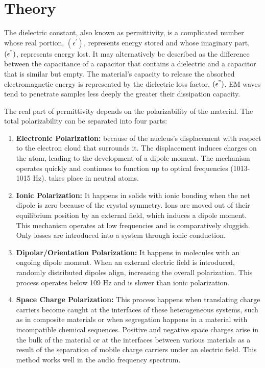 \section{Theory}

	The dielectric constant, also known as permittivity, is a complicated number whose real portion, $(\epsilon^{'})$, represents energy stored and whose imaginary part, $(\epsilon^")$, represents energy lost. It may alternatively be described as the difference between the capacitance of a capacitor that contains a dielectric and a capacitor that is similar but empty. The material's capacity to release the absorbed electromagnetic energy is represented by the dielectric loss factor, $(\epsilon^")$. EM waves tend to penetrate samples less deeply the greater their dissipation capacity.

	The real part of permittivity depends on the polarizability of the material. The total polarizability can be separated into four parts:
	\begin{enumerate}
		\item \textbf{Electronic Polarization:} because of the nucleus's displacement with respect to the electron cloud that surrounds it. The displacement induces charges on the atom, leading to the development of a dipole moment. The mechanism operates quickly and continues to function up to optical frequencies (1013-1015 Hz). takes place in neutral atoms.
		\item \textbf{Ionic Polarization:} It happens in solids with ionic bonding when the net dipole is zero because of the crystal symmetry. Ions are moved out of their equilibrium position by an external field, which induces a dipole moment. This mechanism operates at low frequencies and is comparatively sluggish. Only losses are introduced into a system through ionic conduction.
		\item \textbf{Dipolar/Orientation Polarization:} It happens in molecules with an ongoing dipole moment. When an external electric field is introduced, randomly distributed dipoles align, increasing the overall polarization. This process operates below 109 Hz and is slower than ionic polarization.
		\item \textbf{Space Charge Polarization:} This process happens when translating charge carriers become caught at the interfaces of these heterogeneous systems, such as in composite materials or when segregation happens in a material with incompatible chemical sequences. Positive and negative space charges arise in the bulk of the material or at the interfaces between various materials as a result of the separation of mobile charge carriers under an electric field. This method works well in the audio frequency spectrum.
	\end{enumerate}
